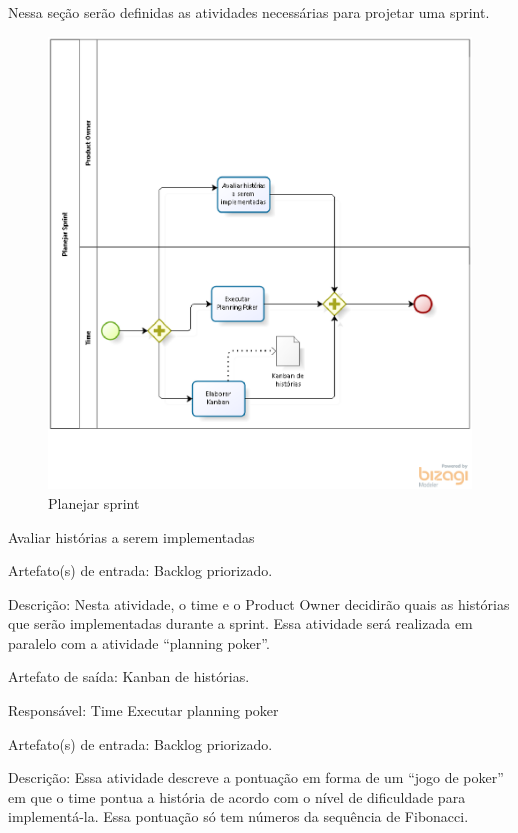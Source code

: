 Nessa seção serão definidas as atividades necessárias para projetar uma sprint.
\begin{figure}[H]
    \centering
    \caption{Planejar sprint}
    \label{processoPlanejar}
    \includegraphics[keepaspectratio=true,scale=0.5]{figuras/processoPlanejar.eps}
\end{figure}

Avaliar histórias a serem implementadas


Artefato(s) de entrada: Backlog priorizado.

Descrição: Nesta atividade, o time e o Product Owner decidirão quais as histórias que serão implementadas durante a sprint. Essa atividade será realizada em paralelo com a atividade “planning poker”.

Artefato de saída: Kanban de histórias.

Responsável: Time
Executar planning poker

Artefato(s) de entrada: Backlog priorizado.

Descrição: Essa atividade descreve a pontuação em forma de um “jogo de poker” em que o time pontua a história de acordo com o nível de dificuldade para implementá-la. Essa pontuação só tem números da sequência de Fibonacci.


